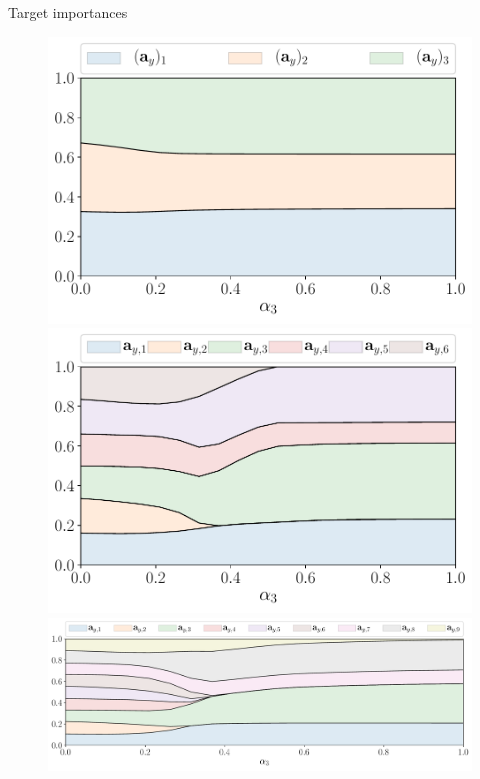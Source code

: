 \documentclass[9pt]{beamer}
\begin{document}
\begin{frame}{Target importances}
\begin{figure}
	\begin{minipage}{.5\linewidth}
			\includegraphics[width=\linewidth]{figs/features_vs_alpha_ecog_3.pdf}
	\end{minipage}%
	\begin{minipage}{.5\linewidth}
			\includegraphics[width=\linewidth]{figs/features_vs_alpha_ecog_6.pdf}
	\end{minipage}\par\medskip
		\includegraphics[width=\linewidth]{figs/features_vs_alpha_ecog_9.pdf}
\end{figure}
\end{frame}
\end{document}
